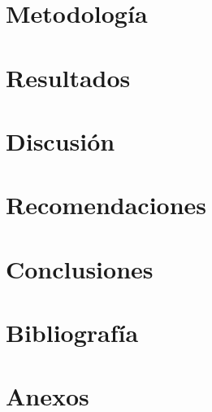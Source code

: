 \documentclass[12pt,letterpaper]{article}
\begin{document}
	\clearpage
	\section{Metodología}
	
	
	\clearpage
	\section{Resultados}
	
	
	\clearpage
	\section{Discusión}
	
	
	\clearpage
	\section{Recomendaciones}
	
	
	\clearpage
	\section{Conclusiones}
	
	
	\clearpage
	\section*{Bibliografía}
	\printbibliography[heading=none] %
	
	\appendix
	\clearpage
	\section{Anexos}
	
	
\end{document}
